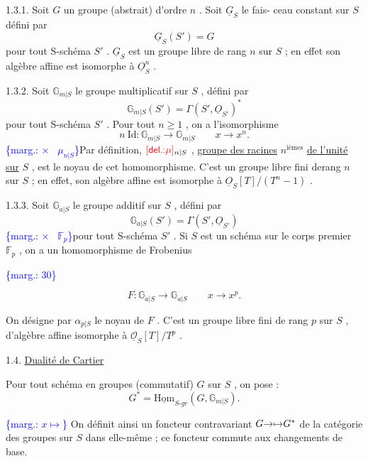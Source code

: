 \documentclass[11pt]{article}
\newcommand{\scanpage}[1]{\par\bigskip\noindent{\small\sffamily[scan #1]}\par}
\newcommand{\mspage}[1]{{\small\sffamily[p.\,#1]}}
\newcommand{\hand}[1]{\textcolor{blue}{#1}}
\let\over\relax
\newcommand{\over}[2]{\textcolor{gray}{#1}\textcolor{blue}{\ensuremath{^{\!\nearrow}}#2}}
\newcommand{\margin}[1]{\textcolor{blue}{\{\textsf{marg.:} #1\}}}
\newcommand{\deleted}[1]{\textcolor{red}{[\textsf{del.:} #1]}}
\newcommand{\uline}[1]{\underline{#1}}
\begin{document}
1.3.1. Soit $G$ un groupe (abstrait) d'ordre $n$ . Soit $\underline{G}_S$ le fais-%
ceau constant sur $S$ défini par
\[ \underline{G}_S(S') = G \]
pour tout S-schéma $S'$ . $\underline{G}_S$ est un groupe libre de rang $n$ sur $S$ ; en
effet son algèbre affine est isomorphe à $\underline{O}_S^n$ .

1.3.2. Soit $\mathbb{G}_{m|S}$ le groupe multiplicatif sur $S$ , défini par
\[ \mathbb{G}_{m|S}(S') = \Gamma(S', \underline{O}_{S'})^* \]
pour tout S-schéma $S'$ . Pour tout $n \geq 1$ , on a l'isomorphisme
\[ n\ \mathrm{Id} : \mathbb{G}_{m|S} \to \mathbb{G}_{m|S} \qquad x \to x^n . \]
\margin{$\times$ \ $\mathbb{\mu}_{n|S}$}Par définition, $\deleted{\mu}_{n|S}$ , \uline{groupe des racines} $n^{\text{ièmes}}$ \uline{de l'unité sur} $S$ , est
le noyau de cet homomorphisme. C'est un groupe libre fini derang $n$ sur $S$ ;
en effet, son algèbre affine est isomorphe à $\underline{O}_S[T]/(T^n-1)$ .

1.3.3. Soit $\mathbb{G}_{a|S}$ le groupe additif sur $S$ , défini par
\[ \mathbb{G}_{a|S}(S') = \Gamma(S', \underline{O}_{S'}) \]
\margin{$\times$ \ $\mathbb{F}_p$}pour tout S-schéma $S'$ . Si $S$ est un schéma sur le corps premier $\mathbb{F}_p$ , on
a un homomorphisme de Frobenius

\margin{30}

\clearpage
\scanpage{129/31}
\mspage{\hand{II.3}}

\[ F : \mathbb{G}_{a|S} \to \mathbb{G}_{a|S} \qquad x \to x^{p} . \]

On désigne par $\alpha_{p|S}$ le noyau de $F$ . C'est un groupe libre fini de rang
$p$ sur $S$ , d'algèbre affine isomorphe à $\underline{\mathcal{O}}_{S}[T]/T^{p}$ .

1.4. \uline{Dualité de Cartier}

Pour tout schéma en groupes (commutatif) $G$ sur $S$ , on pose :
\[ G^{*} = \underline{\mathrm{Hom}}_{S\text{-}gr}(G,\mathbb{G}_{m|S}) . \]

\margin{$x \mapsto$} On définit ainsi un foncteur contravariant $G \over{\to}{\mapsto} G^{*}$ de la catégorie des
groupes sur $S$ dans elle-même ; ce foncteur commute aux changements de base.
\end{document}
